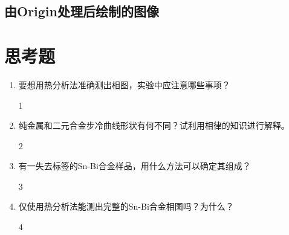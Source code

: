 \documentclass[a4paper,utf8]{article}
\begin{document}
    \subsection{由Origin处理后绘制的图像}
        \begin{figure}[!ht]
        \end{figure}
\section{思考题}
    \begin{enumerate}
        \item 要想用热分析法准确测出相图，实验中应注意哪些事项？\par
        1
        \item 纯金属和二元合金步冷曲线形状有何不同？试利用相律的知识进行解释。\par
        2
        \item 有一失去标签的Sn-Bi合金样品，用什么方法可以确定其组成？\par
        3
        \item 仅使用热分析法能测出完整的Sn-Bi合金相图吗？为什么？\par
        4
    \end{enumerate}
\end{document}

